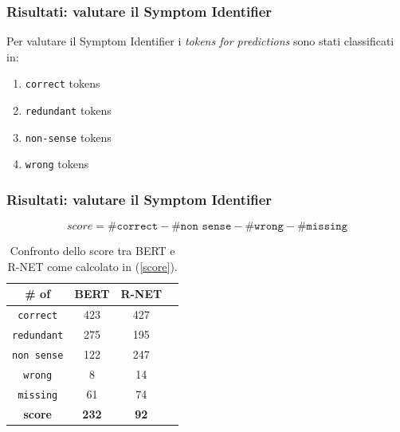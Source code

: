 \documentclass{beamer}
\begin{document}
\begin{frame}
\frametitle{Risultati: valutare il Symptom Identifier}
Per valutare il Symptom Identifier i \emph{tokens for predictions} sono stati classificati in:\pause
\begin{enumerate}
  \item \texttt{correct} tokens\pause
  \item \texttt{redundant} tokens\pause
  \item \texttt{non-sense} tokens\pause
  \item \texttt{wrong} tokens
\end{enumerate}
\end{frame}


\begin{frame}
\frametitle{Risultati: valutare il Symptom Identifier}

\begin{equation}
score = \texttt{\#correct} - \texttt{\#non sense} - \texttt{\#wrong} - \texttt{\#missing}
\label{score}
\end{equation}

\begin{center}
  \begin{table}[h]
  \centering
     \begin{tabular}{| c | c | c | c |} 
     \hline
     \# of & BERT & R-NET \\ [0.5ex] 
     \hline\hline
     \rowcolor{green}
     \texttt{correct} & 423 & 427 \\ 
     \hline
     \rowcolor{lightgreen}
     \texttt{redundant} & 275 & 195 \\
     \hline
     \rowcolor{red}
     \texttt{non sense} & 122 & 247 \\
     \hline
     \rowcolor{red}
     \texttt{wrong} & 8 & 14 \\
     \hline
     \rowcolor{red}
     \texttt{missing} & 61 & 74 \\
     \hline
     \textbf{score} & \textbf{232} & \textbf{92} \\ 
     \hline
    \end{tabular}
    \caption{Confronto dello score tra BERT e R-NET come calcolato in (\ref{score}).}
 \end{table}
\end{center}
\end{frame}
\end{document}
